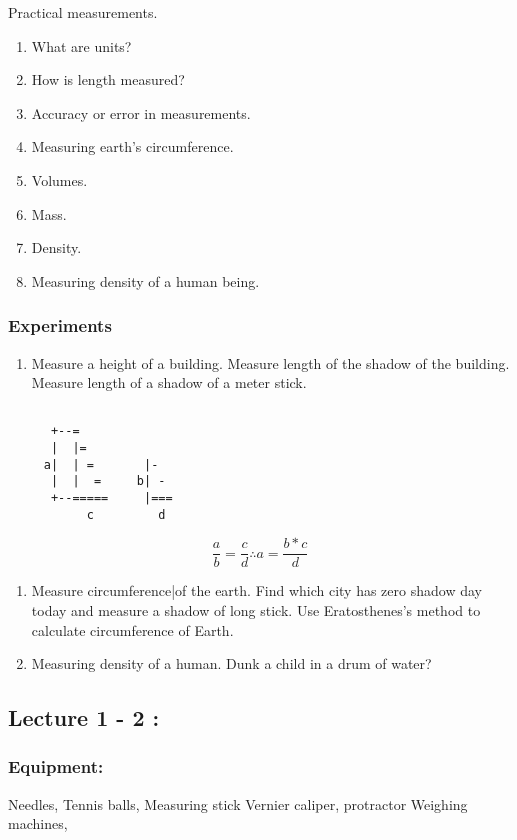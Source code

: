 \documentclass[11pt]{article}
\begin{document}
Practical measurements.


\begin{enumerate}
\item What are units?
\item How is length measured?
\item Accuracy or error in measurements.
\item Measuring earth's circumference.
\item Volumes.
\item Mass.
\item Density.
\item Measuring density of a human being.
\end{enumerate}

\subsubsection{Experiments}
\label{sec:org3fa0e21}
\begin{enumerate}
\item Measure a height of a building.
Measure length of the shadow of the building.
Measure length of a shadow of a meter stick.
\end{enumerate}
\begin{verbatim}

      +--=
      |  |=
     a|  | =       |-
      |  |  =     b| -
      +--=====     |===
           c         d

\end{verbatim}
\[
   \frac{a}{b} = \frac{c}{d} \therefore a = \frac{b * c}{d}
   \]

\begin{enumerate}
\item Measure circumference|of the earth.
Find which city has zero shadow day today and measure a shadow of long stick.
Use Eratosthenes's method to calculate circumference of Earth.

\item Measuring density of a human.
Dunk a child in a drum of water?
\end{enumerate}




\subsection{Lecture 1 - 2 :}
\label{sec:org4793b15}
\subsubsection{Equipment:}
\label{sec:org26c8ca6}
Needles, Tennis balls, Measuring stick
Vernier caliper, protractor
Weighing machines,
\end{document}
